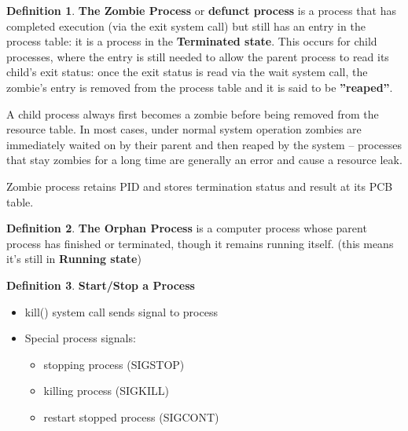 \documentclass[12pt,a4paper]{article}
\theoremstyle{definition}
\newtheorem{definition}{Definition}[section]
\newenvironment{myitemize}
{ \begin{itemize}
    \setlength{\itemsep}{5pt}
    \setlength{\parskip}{0pt}
    \setlength{\parsep}{0pt}     }
{ \end{itemize}                  }
\begin{document}
\begin{definition}{\textbf{The Zombie Process}}
	or \textbf{defunct process} is a process that has completed execution (via the \textsf{exit} system call) but still has an entry in the process table: it is a process in the \textbf{Terminated state}. This occurs for child processes, where the entry is still needed to allow the parent process to read its child's \textsf{exit} status: once the \textsf{exit} status is read via the wait system call, the zombie's entry is removed from the process table and it is said to be \textbf{''reaped''}. 
	
	A child process always first becomes a zombie before being removed from the resource table. In most cases, under normal system operation zombies are immediately waited on by their parent and then reaped by the system – processes that stay zombies for a long time are generally an error and cause a resource leak.
	
	Zombie process retains PID and stores termination status and result at its PCB table.
\end{definition}

\begin{definition}{\textbf{The Orphan Process}}
	is a computer process whose parent process has finished or terminated, though it remains running itself. (this means it's still in \textbf{Running state})
\end{definition}

\begin{definition}{\textbf{Start/Stop a Process}}
	\begin{myitemize}
		\item kill() system call sends signal to process
		\item Special process signals:
		\begin{myitemize}
			\item stopping process (SIGSTOP)
			\item killing process (SIGKILL)
			\item restart stopped process (SIGCONT)
		\end{myitemize}
	\end{myitemize}
\end{definition}
\end{document}
